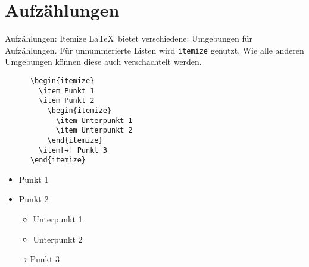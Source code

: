 \section{Aufzählungen}

\begin{frame}[fragile]{Aufzählungen: Itemize}
  \LaTeX\ bietet verschiedene: Umgebungen für Aufzählungen.
  Für unnummerierte Listen wird \texttt{itemize} genutzt.
  Wie alle anderen Umgebungen können diese auch verschachtelt werden.
  \begin{CodeExample}{0.48}
    \begin{lstlisting}
      \begin{itemize}
        \item Punkt 1
        \item Punkt 2
          \begin{itemize}
            \item Unterpunkt 1
            \item Unterpunkt 2
          \end{itemize}
        \item[→] Punkt 3
      \end{itemize}
    \end{lstlisting}
  \CodeResult
    \begin{itemize}
      \item Punkt 1
      \item Punkt 2
        \begin{itemize}
          \item Unterpunkt 1
          \item Unterpunkt 2
        \end{itemize}
      \item[→] Punkt 3
    \end{itemize}
  \end{CodeExample}
\end{frame}

